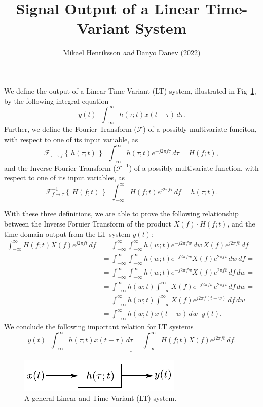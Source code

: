 \documentclass{article}
\author{Mikael Henriksson \emph{and} Danyo Danev (2022)}
\title{Signal Output of a Linear Time-Variant System}
\date{}
\newcommand*{\eqdefU}{\ensuremath{\mathop{\overset{\mathrm{def}}{=}}}}
\newcommand*{\inft}{ \int_{-\infty}^{\infty} }
\begin{document}
\maketitle

We define the output of a Linear Time-Variant (LT) system, illustrated in Fig~\ref{fig:sys}, by the following integral equation
\begin{equation}
    y(t) \eqdefU \inft h(\tau;t) x(t-\tau) \,d\tau.
\end{equation}
Further, we define the Fourier Transform ($\mathcal{F}$) of a possibly multivariate funciton, with respect to one of its input variable, as
\begin{equation}
    \mathcal{F}_{\tau \rightarrow f} \left\{ \, h(\tau;t) \, \right\} \eqdefU \inft h(\tau;t) e^{-j2\pi f\tau} \,d\tau = H(f;t),
\end{equation}
and the Inverse Fourier Transform ($\mathcal{F}^{-1}$) of a possibly multivariate function, with respect to one of its input variables, as
\begin{equation}
    \mathcal{F}^{-1}_{f \rightarrow \tau} \left\{ \, H(f;t) \, \right\} \eqdefU \inft H(f;t) e^{j2\pi f\tau} \,df = h(\tau;t).
\end{equation}

With these three definitions, we are able to prove the following relationship between the Inverse Foruier Transform of the product
$X(f) \cdot H(f;t)$, and the time-domain output from the LT system $y(t)$:
\begin{equation}
    \begin{split}
        \inft H(f;t)X(f)e^{j2\pi ft} \, df &= \inft \inft h(w;t)e^{-j2\pi fw} \,dw \, X(f)e^{j2\pi ft} \,df = \\
        &= \inft \inft h(w;t)e^{-j2\pi fw} X(f) e^{2\pi ft} \,dw \, df = \\
        &= \inft \inft h(w;t)e^{-j2\pi fw} X(f) e^{2\pi ft} \,df \, dw = \\
        &= \inft h(w;t) \inft X(f) e^{-j2\pi fw} e^{2\pi ft} \,df \, dw = \\
        &= \inft h(w;t) \inft X(f) e^{j2\pi f(t-w)} \,df \, dw = \\
        &= \inft h(w;t) x(t-w) \, dw \eqdefU y(t).
    \end{split}
\end{equation}
We conclude the following important relation for LT systems
\begin{equation}
    \underline{\underline{y(t) \eqdefU \inft h(\tau;t) x(t-\tau) \,d\tau = \inft H(f;t)X(f)e^{j2\pi ft} \, df}}.
\end{equation}

\begin{figure}[]
    \centering
    \includegraphics{lt-system.pdf}
    \caption{A general Linear and Time-Variant (LT) system.}
    \label{fig:sys}
\end{figure}
\end{document}
